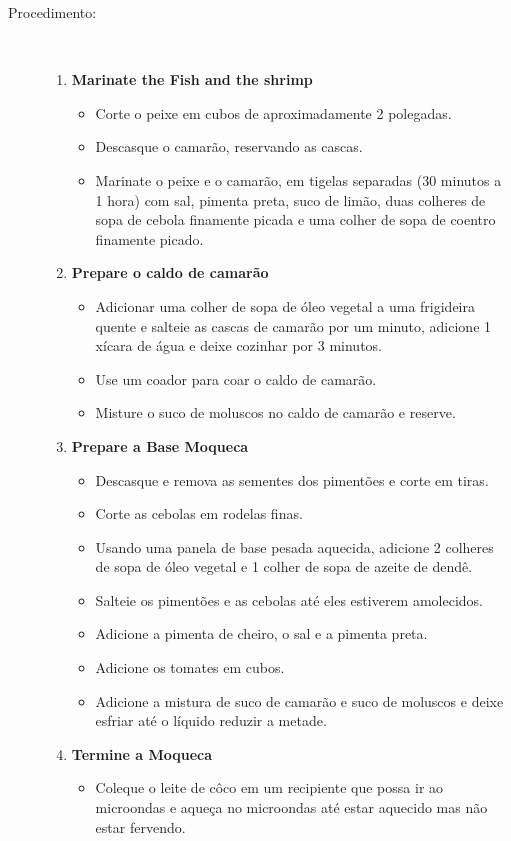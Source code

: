 \documentclass [11pt, letterpaper] {article}
\begin{document}
\begin {description}
\item [Procedimento:] \ \\
\begin {enumerate}
\item {\bf Marinate the Fish and the shrimp}
\begin {itemize}
\item Corte o peixe em cubos de aproximadamente 2 polegadas.
\item Descasque o camarão, reservando as cascas.
\item Marinate o peixe e o camarão, em tigelas separadas (30 minutos a 1 hora) com sal, pimenta preta,
 suco de limão, duas colheres de sopa de cebola finamente picada e uma colher de sopa
 de coentro finamente picado.
\end {itemize}
\item {\bf Prepare o caldo de camarão}
\begin {itemize}
\item Adicionar uma colher de sopa de óleo vegetal a uma frigideira quente
 e salteie as cascas de camarão por um minuto, adicione 1 xícara de água e deixe cozinhar por 3 minutos.
\item Use um coador para coar o caldo de camarão.
\item Misture o suco de moluscos no caldo de camarão e reserve.
\end {itemize}
\item {\bf Prepare a Base Moqueca}
\begin {itemize}
\item Descasque e remova as sementes dos piment\~oes e corte em tiras.
\item Corte as cebolas em rodelas finas.
\item Usando uma panela de base pesada aquecida, adicione 2 colheres de sopa de óleo vegetal
 e 1 colher de sopa de azeite de dend\^e.
\item Salteie os pimentões e as cebolas até eles estiverem amolecidos.
\item Adicione a pimenta de cheiro, o sal e a pimenta preta.
\item Adicione os tomates em cubos.
\item Adicione a mistura de suco de camarão e suco de moluscos e deixe esfriar até o líquido reduzir a metade.
\end {itemize}
\item {\bf Termine a Moqueca}
\begin {itemize}
\item Coleque o leite de c\^oco em um recipiente que possa ir ao microondas e aque\c{c}a no microondas at\'e estar aquecido mas n\~ao estar fervendo.

\end{itemize}
\end{enumerate}
\end{description}
\end{document}
